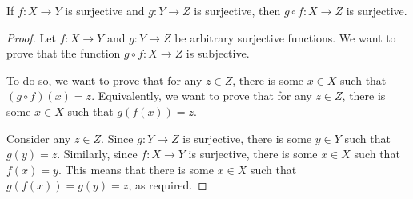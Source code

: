 \begin{proposition}
If $f:X\to Y$ is surjective and $g:Y\to Z$ is surjective, then $g \circ f:X\to Z$ is surjective.
\end{proposition}
\begin{proof}
Let $f:X\to Y$ and $g:Y\to Z$ be arbitrary surjective functions. We want to prove that the function $g \circ f:X\to Z$ is subjective. 

To do so, we want to prove that for any $z \in Z$, there is some $x \in X$ such that $(g \circ f)(x) = z$. Equivalently, we want to prove that for any $z \in Z$, there is some $x \in X$ such that $g(f(x)) = z$.

Consider any $z \in Z$. Since $g:Y\to Z$ is surjective, there is some $y \in Y$ such that $g(y) = z$. Similarly, since $f:X\to Y$ is surjective, there is some $x \in X$ such that $f(x) = y$. This means that there is some $x \in X$ such that $g(f(x)) = g(y) = z$, as required.
\end{proof}

